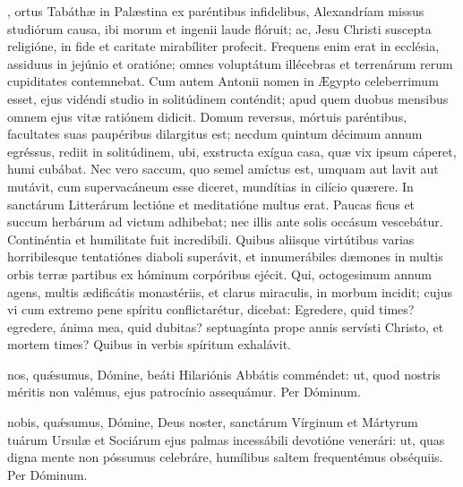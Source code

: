 \documentclass[fontsize=9pt,paper=A6,twoside,BCOR=1mm,DIV=22,headinclude]{scrarticle}
\begin{document}
\begin{multicols}{2}
{

, ortus Tabáthæ in Palæstina ex paréntibus infidelibus, Alexandríam missus studiórum causa, ibi morum et ingenii laude flóruit; ac, Jesu Christi suscepta religióne, in fide et caritate mirabíliter profecit. Frequens enim erat in ecclésia, assiduus in jejúnio et oratióne; omnes voluptátum illécebras et terrenárum rerum cupiditates contemnebat. Cum autem Antonii nomen in Ægypto celeberrimum esset, ejus vidéndi studio in solitúdinem conténdit; apud quem duobus mensibus omnem ejus vitæ ratiónem didicit. Domum reversus, mórtuis paréntibus, facultates suas paupéribus dilargitus est; necdum quintum décimum annum egréssus, rediit in solitúdinem, ubi, exstructa exígua casa, quæ vix ipsum cáperet, humi cubábat. Nec vero saccum, quo semel amíctus est, umquam aut lavit aut mutávit, cum supervacáneum esse diceret, mundítias in cilício quærere. In sanctárum Litterárum lectióne et meditatióne multus erat. Paucas ficus et succum herbárum ad victum adhibebat; nec illis ante solis occásum vescebátur. Continéntia et humilitate fuit incredibili. Quibus aliisque virtútibus varias horribilesque tentatiónes diaboli superávit, et innumerábiles dæmones in multis orbis terræ partibus ex hóminum corpóribus ejécit. Qui, octogesimum annum agens, multis ædificátis monastériis, et clarus miraculis, in morbum incidit; cujus vi cum extremo pene spíritu conflictarétur, dicebat: Egredere, quid times? egredere, ánima mea, quid dubitas? septuagínta prope annis servísti Christo, et mortem times? Quibus in verbis spíritum exhalávit.

\Te 


\AiiC 

\VRCii 

 nos, quǽsumus, Dómine, beáti Hilariónis Abbátis comméndet: ut, quod nostris méritis non valémus, ejus patrocínio assequámur. \red{(}Per Dóminum.\red{)}


\AiiV 

\VRVii 

 nobis, quǽsumus, Dómine, Deus noster, sanctárum Vírginum et Mártyrum tuárum Ursulæ et Sociárum ejus palmas incessábili devotióne venerári: ut, quas digna mente non póssumus celebráre, humílibus saltem frequentémus obséquiis. Per Dóminum.

}
\end{multicols}
\end{document}
